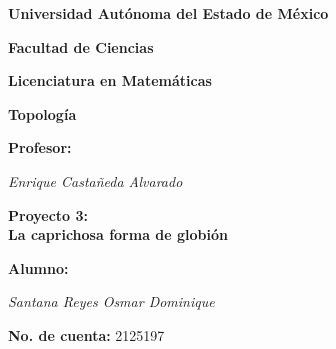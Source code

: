 \documentclass[12pt]{article}
\begin{document}
    \begin{titlepage}
        \centering
        \vspace{2.7cm}
        {\Huge \textbf{Universidad Autónoma del Estado de México}\par}
        \vspace{0.9cm}

        {\Huge \textbf{Facultad de Ciencias}\par}
        \vspace{0.9cm}

        {\Huge \textbf{Licenciatura en Matemáticas}\par}
        \vspace{0.9cm}

        {\huge \textbf{Topología}\par}
        \vspace{0.9cm}

        {\huge \textbf{Profesor:}\par}
        \vspace{0.3cm}
        {\huge \textsl{Enrique Castañeda Alvarado}}\par
        \vspace{1.4cm}

        {\huge \textbf{Proyecto 3: \\ La caprichosa forma de globión}\par}
        \vspace{1.4cm}

        {\huge \textbf{Alumno:}\par}
        \vspace{0.3cm}
        {\huge \textsl{Santana Reyes Osmar Dominique}}\par
        \vspace{0.9cm}

        {\huge \textbf{No. de cuenta:} 2125197 \par}
        \vspace{0.7cm}
        \vfill
        \par         %
    \end{titlepage}
\end{document}
